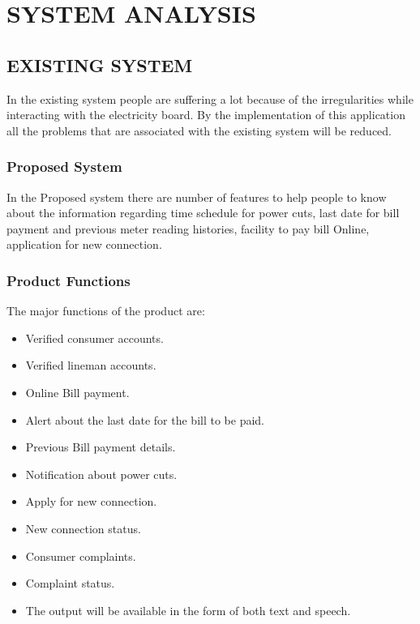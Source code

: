 \documentclass[12pt,a4paper,oneside]{report}
\begin{document}
\chapter{SYSTEM ANALYSIS}


\section {EXISTING SYSTEM}
\par  In the existing system people are suffering a lot because of the irregularities while interacting
with the electricity board. By the implementation of this application all the problems
that are associated with the existing system will be reduced.

\subsection {Proposed System}
In the Proposed system there are number of features to help people to know about the
information regarding time schedule for power cuts, last date for bill payment and previous
meter reading histories, facility to pay bill Online, application for new connection.
\subsection {Product Functions}
The major functions of the product are:
\begin{itemize}
 \item Verified consumer accounts.
 \item Verified lineman accounts.
 \item Online Bill payment.
 \item Alert about the last date for the bill to be paid.
 \item Previous Bill payment details.
 \item Notification about power cuts.
 \item Apply for new connection.
 \item New connection status.
 \item Consumer complaints.
 \item Complaint status.
 
\item The output will be available in the form of both text and speech.
\end{itemize}
\end{document}
